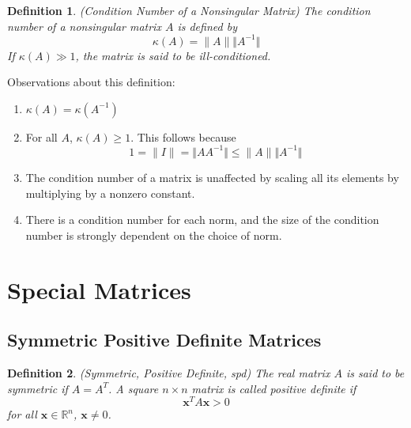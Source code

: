 \documentclass[12pt]{article}
\newtheorem{definition}{Definition}
\theoremstyle{definition}
\newcommand{\R}{\mathbb{R}}
\newcommand{\norm}[1]{\lVert#1\rVert}
\newcommand{\x}{\bm{x}}
\begin{document}
\begin{definition}(Condition Number of a Nonsingular Matrix)
The condition number of a nonsingular matrix $A$ is defined by 
\begin{equation}
	\kappa(A) = \norm{A} \Vert A^{-1} \Vert
\end{equation}
If $\kappa(A) \gg 1$, the matrix is said to be ill-conditioned.
\end{definition}
Observations about this definition:
\begin{enumerate}
	\item $\kappa(A) = \kappa(A^{-1})$ 
	\item For all $A$, $\kappa(A) \geq 1$. This follows because
	\begin{equation}
		1 = \norm{I} = \Vert A A^{-1} \Vert \leq \norm{A} \Vert A^{-1} \Vert
	\end{equation}
	\item The condition number of a matrix is unaffected by scaling all its elements by multiplying by a nonzero constant.
	\item There is a condition number for each norm, and the size of the condition number is strongly dependent on the choice of norm.
\end{enumerate}

\section{Special Matrices}
\subsection{Symmetric Positive Definite Matrices }
\begin{definition}(Symmetric, Positive Definite, spd)
The real matrix $A$ is said to be symmetric if $A = A^T$. A square $n \times n$ matrix is called positive definite if 
\begin{equation}
 	\x^T A \x > 0
\end{equation}
for all $\x \in \R^n$, $\x \neq 0$. 
\end{definition}
\end{document}
